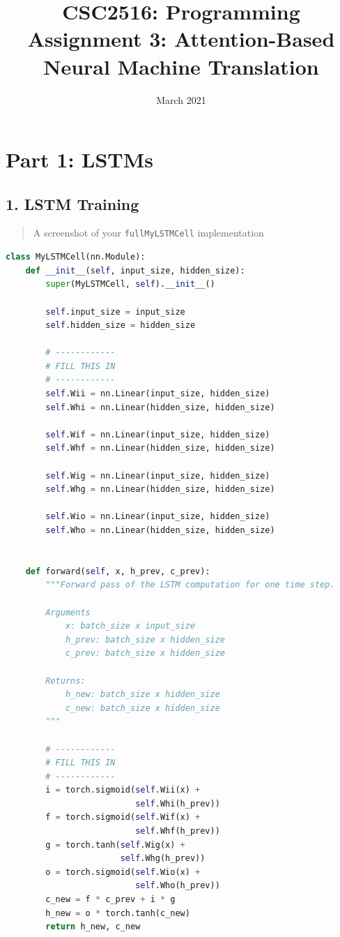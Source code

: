 \documentclass{article}
\title{CSC2516: Programming Assignment 3: Attention-Based Neural Machine Translation}
\author{}
\date{March 2021}
\begin{document}
\maketitle

\section*{Part 1: LSTMs}

\subsection*{1. LSTM Training}

\begin{quote}
A screenshot of your \texttt{fullMyLSTMCell} implementation
\end{quote}

\begin{lstlisting}[language=Python]
class MyLSTMCell(nn.Module):
    def __init__(self, input_size, hidden_size):
        super(MyLSTMCell, self).__init__()

        self.input_size = input_size
        self.hidden_size = hidden_size

        # ------------
        # FILL THIS IN
        # ------------
        self.Wii = nn.Linear(input_size, hidden_size)
        self.Whi = nn.Linear(hidden_size, hidden_size)

        self.Wif = nn.Linear(input_size, hidden_size)
        self.Whf = nn.Linear(hidden_size, hidden_size)

        self.Wig = nn.Linear(input_size, hidden_size)
        self.Whg = nn.Linear(hidden_size, hidden_size)

        self.Wio = nn.Linear(input_size, hidden_size)
        self.Who = nn.Linear(hidden_size, hidden_size)


    def forward(self, x, h_prev, c_prev):
        """Forward pass of the LSTM computation for one time step.

        Arguments
            x: batch_size x input_size
            h_prev: batch_size x hidden_size
            c_prev: batch_size x hidden_size

        Returns:
            h_new: batch_size x hidden_size
            c_new: batch_size x hidden_size
        """

        # ------------
        # FILL THIS IN
        # ------------
        i = torch.sigmoid(self.Wii(x) + 
                          self.Whi(h_prev))
        f = torch.sigmoid(self.Wif(x) + 
                          self.Whf(h_prev))
        g = torch.tanh(self.Wig(x) + 
                       self.Whg(h_prev))
        o = torch.sigmoid(self.Wio(x) + 
                          self.Who(h_prev))
        c_new = f * c_prev + i * g
        h_new = o * torch.tanh(c_new)
        return h_new, c_new
\end{lstlisting}
\end{document}
